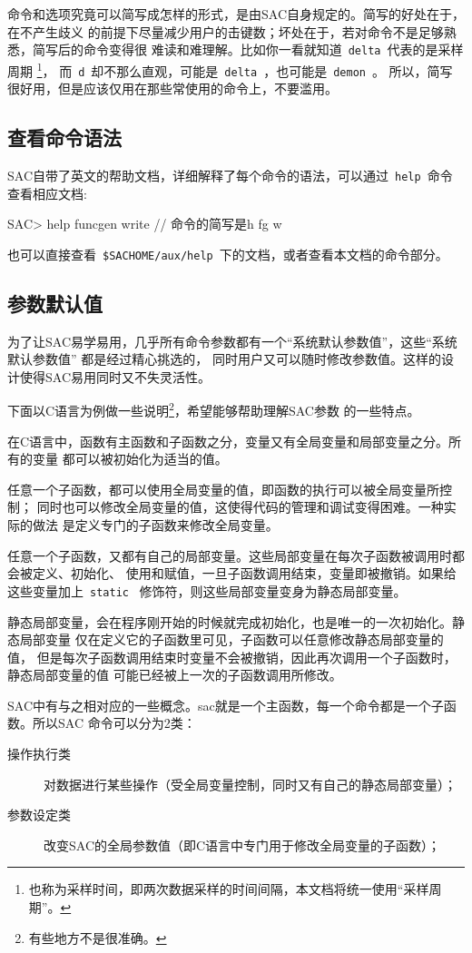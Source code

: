 命令和选项究竟可以简写成怎样的形式，是由SAC自身规定的。简写的好处在于，在不产生歧义
的前提下尽量减少用户的击键数；坏处在于，若对命令不是足够熟悉，简写后的命令变得很
难读和难理解。比如你一看就知道~\lstinline{delta}~代表的是采样周期
\footnote{也称为采样时间，即两次数据采样的时间间隔，本文档将统一使用``采样周期''。}，
而~\lstinline{d}~却不那么直观，可能是~\lstinline{delta}~，也可能是~\lstinline{demon}~。
所以，简写很好用，但是应该仅用在那些常使用的命令上，不要滥用。

\subsection{查看命令语法}
SAC自带了英文的帮助文档，详细解释了每个命令的语法，可以通过~\lstinline{help}~命令
查看相应文档:
\begin{SACCode}
SAC> help funcgen write   // 命令的简写是h fg w
\end{SACCode}
也可以直接查看~\lstinline{$SACHOME/aux/help}~下的文档，或者查看本文档的命令部分。

\subsection{参数默认值}
为了让SAC易学易用，几乎所有命令参数都有一个``系统默认参数值''，这些``系统默认参数值''
都是经过精心挑选的，
同时用户又可以随时修改参数值。这样的设计使得SAC易用同时又不失灵活性。

下面以C语言为例做一些说明\footnote{有些地方不是很准确。}，希望能够帮助理解SAC参数
的一些特点。

在C语言中，函数有主函数和子函数之分，变量又有全局变量和局部变量之分。所有的变量
都可以被初始化为适当的值。

任意一个子函数，都可以使用全局变量的值，即函数的执行可以被全局变量所控制；
同时也可以修改全局变量的值，这使得代码的管理和调试变得困难。一种实际的做法
是定义专门的子函数来修改全局变量。

任意一个子函数，又都有自己的局部变量。这些局部变量在每次子函数被调用时都会被定义、初始化、
使用和赋值，一旦子函数调用结束，变量即被撤销。如果给这些变量加上~\lstinline{static}~
修饰符，则这些局部变量变身为静态局部变量。

静态局部变量，会在程序刚开始的时候就完成初始化，也是唯一的一次初始化。静态局部变量
仅在定义它的子函数里可见，子函数可以任意修改静态局部变量的值，
但是每次子函数调用结束时变量不会被撤销，因此再次调用一个子函数时，静态局部变量的值
可能已经被上一次的子函数调用所修改。

SAC中有与之相对应的一些概念。sac就是一个主函数，每一个命令都是一个子函数。所以SAC
命令可以分为2类：
\begin{description}
\item[操作执行类] 对数据进行某些操作（受全局变量控制，同时又有自己的静态局部变量）；
\item[参数设定类] 改变SAC的全局参数值（即C语言中专门用于修改全局变量的子函数）； 
\end{description}

